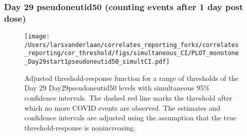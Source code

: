 \documentclass[]{article}
\begin{document}
\clearpage
\clearpage

\clearpage

\hypertarget{day-29-pseudoneutid50-counting-events-after-1-day-post-dose-2}{%
\subsubsection{Day 29 pseudoneutid50 (counting events after 1 day post
dose)}\label{day-29-pseudoneutid50-counting-events-after-1-day-post-dose-2}}

\begin{figure}[H]
\centering
\texttt{[image: /Users/larsvanderlaan/correlates\_reporting\_forks/correlates\_reporting/cor\_threshold/figs/simultaneous\_CI/PLOT\_monotone\_Day29start1pseudoneutid50\_simultCI.pdf]}
\caption{Adjusted threshold-response function for a range of thresholds of the
  Day 29 Day29pseudoneutid50 levels with simultaneous 95\% confidence intervals. The dashed red line marks the threshold after which no more COVID events are observed. The estimates and confidence intervals are adjusted using the assumption that the true threshold-response is nonincreasing.}
\end{figure}
\end{document}
